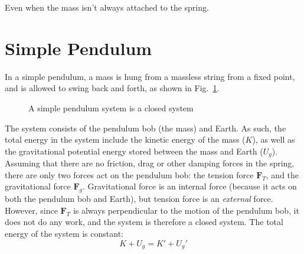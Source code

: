 \begin{example}
  Even when the mass isn't always attached to the spring.
\end{example}


\section{Simple Pendulum}
\label{sec:simple-pendulum-energy}
In a simple pendulum, a mass is hung from a massless string from a fixed point,
and is allowed to swing back and forth, as shown in
Fig.~\ref{fig:pendulum-system}.
\begin{figure}[ht]
  \centering
  \caption{A simple pendulum system is a closed system}
  \label{fig:pendulum-system}
\end{figure}
The system consists of the pendulum bob (the mass) and Earth. As such, the
total energy in the system include the kinetic energy of the mass ($K$), as
well as the gravitational potential energy stored between the mass and Earth
($U_g$). Assuming that there are no friction, drag or other damping forces in
the spring, there are only two forces act on the pendulum bob: the tension force
$\bm F_T$, and the gravitational force $\bm F_g$. Gravitational force
is an internal force (because it acts on both the pendulum bob and Earth), but
tension force is an \emph{external} force. However, since $\bm F_T$ is
always perpendicular to the motion of the pendulum bob, it does not do any
work, and the system is therefore a closed system. The total energy of the
system is constant:
\begin{equation}
  K + U_g =K'+U_g'
\end{equation}
    

